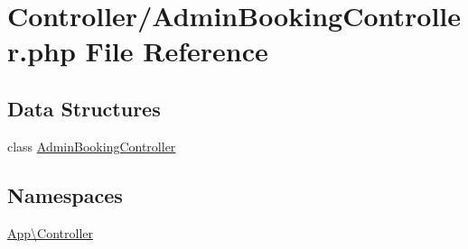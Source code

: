 \hypertarget{_admin_booking_controller_8php}{}\section{Controller/\+Admin\+Booking\+Controller.php File Reference}
\label{_admin_booking_controller_8php}
\subsection*{Data Structures}
\begin{DoxyCompactItemize}
\item 
class \mbox{\hyperlink{class_app_1_1_controller_1_1_admin_booking_controller}{Admin\+Booking\+Controller}}
\end{DoxyCompactItemize}
\subsection*{Namespaces}
\begin{DoxyCompactItemize}
\item 
 \mbox{\hyperlink{namespace_app_1_1_controller}{App\textbackslash{}\+Controller}}
\end{DoxyCompactItemize}
